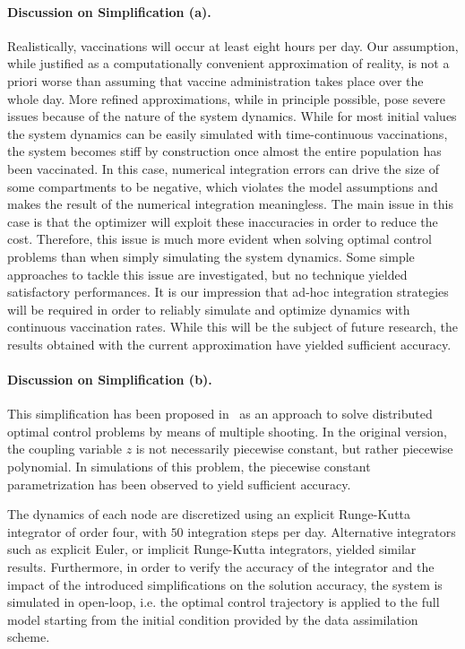 \paragraph{Discussion on Simplification (a).}
Realistically, vaccinations will occur at least eight hours per day. Our assumption, while justified as a computationally convenient approximation of reality, is not a priori worse than assuming that vaccine administration takes place over the whole day. More refined approximations, while in principle possible, pose severe issues because of the nature of the system dynamics. While for most initial values the system dynamics can be easily simulated with time-continuous vaccinations, the system becomes stiff by construction once almost the entire population has been vaccinated. In this case, numerical integration errors can drive the size of some compartments to be negative, which violates the model assumptions and makes the result of the numerical integration meaningless. The main issue in this case is that the optimizer will exploit these inaccuracies in order to reduce the cost. Therefore, this issue is much more evident when solving optimal control problems than when simply simulating the system dynamics. Some simple approaches to tackle this issue are investigated, but no technique yielded satisfactory performances. It is our impression that ad-hoc integration strategies will be required in order to reliably simulate and optimize dynamics with continuous vaccination rates. While this will be the subject of future research, the results obtained with the current approximation have yielded sufficient accuracy.

\paragraph{Discussion on Simplification (b).}
This simplification has been proposed in~\cite{Savorgnan:MultipleShootingDistributed:2011} as an approach to solve distributed optimal control problems by means of multiple shooting. In the original version, the coupling variable $z$ is not necessarily piecewise constant, but rather piecewise polynomial. In simulations of this problem, the piecewise constant parametrization has been observed to yield sufficient accuracy.

The dynamics of each node are discretized using an explicit Runge-Kutta integrator of order four, with $50$ integration steps per day. Alternative integrators such as explicit Euler, or implicit Runge-Kutta integrators, yielded similar results. Furthermore, in order to verify the accuracy of the integrator and the impact of the introduced simplifications on the solution accuracy, the system is simulated in open-loop, i.e. the optimal control trajectory is applied to the full model starting from the initial condition provided by the data assimilation scheme.

